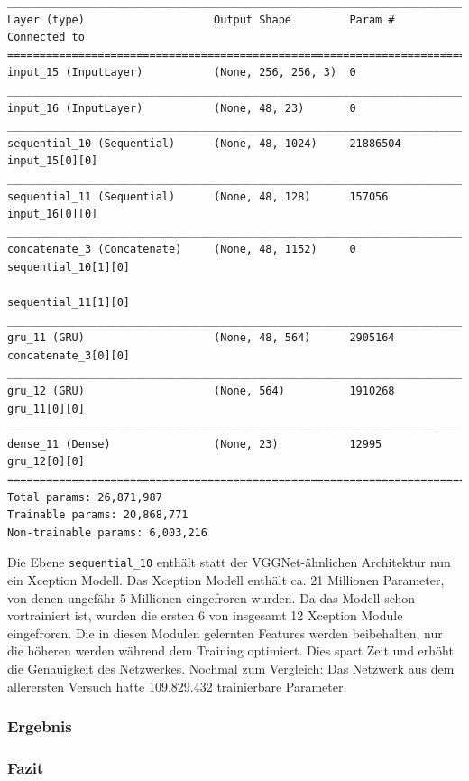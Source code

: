 \documentclass[pdftex,a4paper,halfparskip, article]{scrartcl}
\begin{document}
\begin{verbatim}
______________________________________________________________________________
Layer (type)                    Output Shape         Param #     Connected to                     
==============================================================================
input_15 (InputLayer)           (None, 256, 256, 3)  0                                            
______________________________________________________________________________
input_16 (InputLayer)           (None, 48, 23)       0                                            
______________________________________________________________________________
sequential_10 (Sequential)      (None, 48, 1024)     21886504    input_15[0][0]                   
______________________________________________________________________________
sequential_11 (Sequential)      (None, 48, 128)      157056      input_16[0][0]                   
______________________________________________________________________________
concatenate_3 (Concatenate)     (None, 48, 1152)     0           sequential_10[1][0]              
                                                                 sequential_11[1][0]              
______________________________________________________________________________
gru_11 (GRU)                    (None, 48, 564)      2905164     concatenate_3[0][0]              
______________________________________________________________________________
gru_12 (GRU)                    (None, 564)          1910268     gru_11[0][0]                     
______________________________________________________________________________
dense_11 (Dense)                (None, 23)           12995       gru_12[0][0]                     
==============================================================================
Total params: 26,871,987
Trainable params: 20,868,771
Non-trainable params: 6,003,216
\end{verbatim}

Die Ebene \texttt{sequential\_10} enthält statt der VGGNet-ähnlichen Architektur nun ein Xception Modell. Das Xception Modell enthält ca. 21 Millionen Parameter, von denen ungefähr 5 Millionen eingefroren wurden. Da das Modell schon vortrainiert ist, wurden die ersten 6 von insgesamt 12 Xception Module eingefroren. Die in diesen Modulen gelernten Features werden beibehalten, nur die höheren werden während dem Training optimiert. Dies spart Zeit und erhöht die Genauigkeit des Netzwerkes.
Nochmal zum Vergleich: Das Netzwerk aus dem allerersten Versuch hatte 109.829.432 trainierbare Parameter.

\subsubsection*{Ergebnis}

\subsubsection*{Fazit}


 
\end{document}
